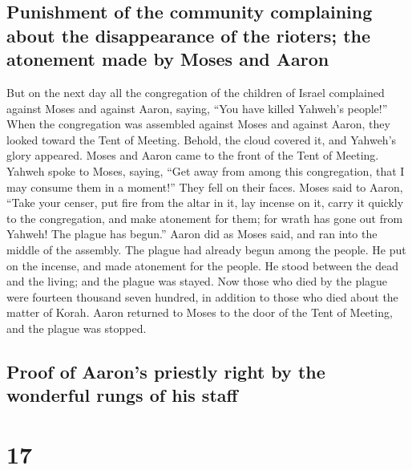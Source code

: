 \hypertarget{punishment-of-the-community-complaining-about-the-disappearance-of-the-rioters-the-atonement-made-by-moses-and-aaron}{%
\subsection{Punishment of the community complaining about the
disappearance of the rioters; the atonement made by Moses and
Aaron}\label{punishment-of-the-community-complaining-about-the-disappearance-of-the-rioters-the-atonement-made-by-moses-and-aaron}}

 But on the next day all the congregation of the children
of Israel complained against Moses and against Aaron, saying, ``You have
killed Yahweh's people!''  When the congregation was
assembled against Moses and against Aaron, they looked toward the Tent
of Meeting. Behold, the cloud covered it, and Yahweh's glory appeared.
 Moses and Aaron came to the front of the Tent of
Meeting.  Yahweh spoke to Moses, saying, 
``Get away from among this congregation, that I may consume them in a
moment!'' They fell on their faces.  Moses said to Aaron,
``Take your censer, put fire from the altar in it, lay incense on it,
carry it quickly to the congregation, and make atonement for them; for
wrath has gone out from Yahweh! The plague has begun.'' 
Aaron did as Moses said, and ran into the middle of the assembly. The
plague had already begun among the people. He put on the incense, and
made atonement for the people.  He stood between the dead
and the living; and the plague was stayed.  Now those who
died by the plague were fourteen thousand seven hundred, in addition to
those who died about the matter of Korah.  Aaron returned
to Moses to the door of the Tent of Meeting, and the plague was stopped.

\hypertarget{proof-of-aarons-priestly-right-by-the-wonderful-rungs-of-his-staff}{%
\subsection{Proof of Aaron's priestly right by the wonderful rungs of
his
staff}\label{proof-of-aarons-priestly-right-by-the-wonderful-rungs-of-his-staff}}

\hypertarget{section-16}{%
\section{17}\label{section-16}}

